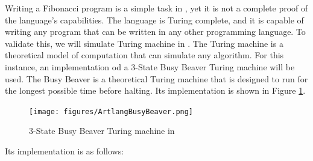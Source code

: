 Writing a Fibonacci program is a simple task in \sculpt, yet it is not a complete proof of the language's capabilities.
The language is Turing complete, and it is capable of writing any program that can be written in any other programming language.
To validate this, we will simulate Turing machine in \sculpt.
The Turing machine is a theoretical model of computation that can simulate any algorithm.
For this instance, an implementation od a 3-State Busy Beaver Turing machine will be used.
The Busy Beaver is a theoretical Turing machine that is designed to run for the longest possible time before halting.
Its \sculpt implementation is shown in Figure \ref{fig:busybeaver}.

\begin{figure}
    \centering
    \texttt{[image: figures/ArtlangBusyBeaver.png]}
    \caption{3-State Busy Beaver Turing machine in \sculpt}
    \label{fig:busybeaver}
    \vspace{5pt}
\end{figure}

Its \sculpter implementation is as follows:

